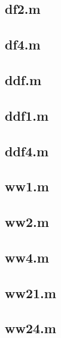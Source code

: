 \documentclass{article}
\begin{document}
	\subsection{df2.m}
	
	\subsection{df4.m}
	
	\subsection{ddf.m}
	
	\subsection{ddf1.m}
	
	\subsection{ddf4.m}
	
	
	\subsection{ww1.m}
	
	\subsection{ww2.m}
	
	\subsection{ww4.m}
	
	\subsection{ww21.m}
	
	\subsection{ww24.m}
	


	
\end{document}
